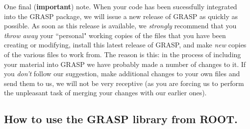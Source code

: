 One final ({\bf important}) note.  When your code has been sucessfully
integrated into the GRASP package, we will issue a new release of
GRASP as quickly as possible.  As soon as this release is available,
we {\it strongly} recommend that you {\it throw away} your ``personal"
working copies of the files that you have been creating or modifying,
install this latest release of GRASP, and make {\it new} copies of
the various files to work from.  The reason is this: in the
process of including your material into GRASP we have probably made
a number of changes to it.  If you {\it don't} follow our suggestion,
make additional changes to your own files and send them to us, we will
not be very receptive (as you are forcing us to perform the unpleasant
task of merging your changes with our earlier ones).

\subsection{How to use the GRASP library from ROOT.}

